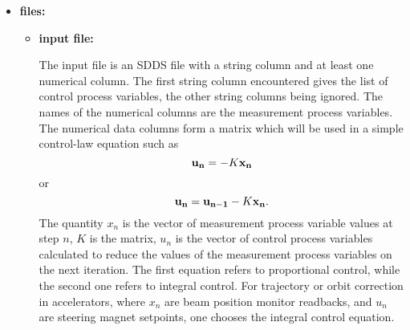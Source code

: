 \begin{itemize}
\begin{verbatim}
       [-actionLimit={value=<value>|file=<filename>}]
       [-testValues=<SDDSfile>] [-statistics=<filename>[,mode=<full|brief>]] 
       [-auxiliaryOutput=matrixFile=<file>,controlQuantityDefinition=<file>,
           filterFile=<file>],controlLogFile=<file>[,mode=<integral|proportional>] 
       [-runControlPV={string=<string>|parameter=<string>},pingTimeout=<value>
       [-runControlDescription={string=<string>|parameter=<string>}]
       [-launcherPV=<pvname>]
       [-verbose] [-dryRun] [-warning]
       [-servermode=pid=<file>,command=<file>]
       [-controlLogFile=<file>] 
       [-glitchLogFile=file=<string>,[readbackRmsThreshold=<value>][,controlRmsThreshold=<value>][,rows=<integer]]
       [-CASecurityTest] [-waveforms=<filename>,<type>]

Perform simple feedback on APS control system process variables using ezca calls.
\end{verbatim}
\item {\bf files:}
\begin{itemize}
\item {\bf input file:} \par
The input file is an SDDS file with a string column and at least one numerical column. 
The first string column encountered gives the list of 
control process variables, the other string columns being ignored.
The names of the numerical columns are the measurement process variables. 
The numerical data columns form a matrix which will be used in a simple
control-law equation such as
\begin{equation}
{\bf u_n} = - K {\bf x_n}
\end{equation}
or
\begin{equation}
{\bf u_n} = {\bf u_{n-1}} - K {\bf x_n}.
\end{equation}
The quantity $x_n$ is the vector of measurement process variable
values at step $n$, $K$ is the matrix, $u_n$ is the vector of control
process variables calculated to reduce the values of the measurement
process variables on the next iteration.  The first equation refers to
proportional control, while the second one refers to integral
control. For trajectory or orbit correction in accelerators, where
$x_n$ are beam position monitor readbacks, and $u_n$ are steering
magnet setpoints, one chooses the integral control equation.


\end{itemize}
\end{itemize}
